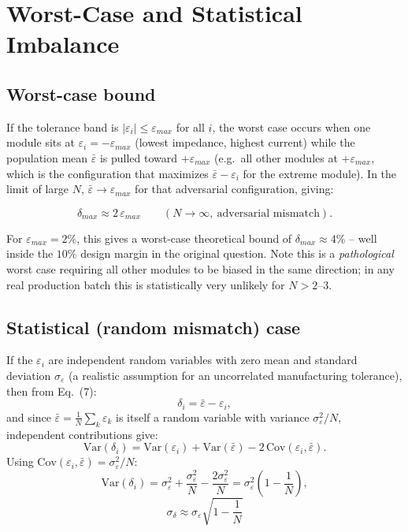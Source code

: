 \documentclass[11pt,a4paper]{article}
\begin{document}
\section{Worst-Case and Statistical Imbalance}

\subsection{Worst-case bound}

If the tolerance band is $|\varepsilon_i|\le \varepsilon_{max}$ for all $i$, the worst case occurs when one module sits at $\varepsilon_i = -\varepsilon_{max}$ (lowest impedance, highest current) while the population mean $\bar\varepsilon$ is pulled toward $+\varepsilon_{max}$ (e.g.\ all other modules at $+\varepsilon_{max}$, which is the configuration that maximizes $\bar\varepsilon - \varepsilon_i$ for the extreme module). In the limit of large $N$, $\bar\varepsilon \to \varepsilon_{max}$ for that adversarial configuration, giving:

\begin{equation}
\delta_{max} \approx 2\,\varepsilon_{max} \qquad (N\to\infty,\ \text{adversarial mismatch}).
\end{equation}

For $\varepsilon_{max}=2\%$, this gives a worst-case theoretical bound of $\delta_{max}\approx 4\%$ -- well inside the $10\%$ design margin in the original question. Note this is a \emph{pathological} worst case requiring all other modules to be biased in the same direction; in any real production batch this is statistically very unlikely for $N>2$--$3$.

\subsection{Statistical (random mismatch) case}

If the $\varepsilon_i$ are independent random variables with zero mean and standard deviation $\sigma_\varepsilon$ (a realistic assumption for an uncorrelated manufacturing tolerance), then from Eq.~(7):
\begin{equation}
\delta_i = \bar\varepsilon - \varepsilon_i,
\end{equation}
and since $\bar\varepsilon = \frac{1}{N}\sum_k \varepsilon_k$ is itself a random variable with variance $\sigma_\varepsilon^2/N$, independent contributions give:
\begin{equation}
\mathrm{Var}(\delta_i) = \mathrm{Var}(\varepsilon_i) + \mathrm{Var}(\bar\varepsilon) - 2\,\mathrm{Cov}(\varepsilon_i,\bar\varepsilon).
\end{equation}
Using $\mathrm{Cov}(\varepsilon_i,\bar\varepsilon) = \sigma_\varepsilon^2/N$:
\begin{equation}
\mathrm{Var}(\delta_i) = \sigma_\varepsilon^2 + \frac{\sigma_\varepsilon^2}{N} - \frac{2\sigma_\varepsilon^2}{N} = \sigma_\varepsilon^2\left(1-\frac{1}{N}\right),
\end{equation}
\begin{equation}
\boxed{\;\sigma_\delta \approx \sigma_\varepsilon\sqrt{1-\dfrac{1}{N}}\;}
\end{equation}
\end{document}
